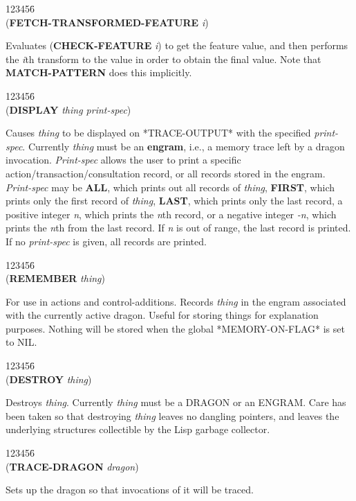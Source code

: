 \begin{tabbing}
123456\= \kill
\\
({\bf FETCH-TRANSFORMED-FEATURE} {\it i\/})
\end{tabbing}
Evaluates ({\bf CHECK-FEATURE} {\it i\/}) to get the feature value,
and then performs the {\it i\/}th transform to the value in order to
obtain the final value.  Note that {\bf MATCH-PATTERN} does this
implicitly.

\begin{tabbing}
123456\= \kill
\\
({\bf DISPLAY} {\it thing print-spec\/})
\end{tabbing}
Causes {\it thing\/} to be displayed on *TRACE-OUTPUT* with the specified
{\it print-spec\/}.  Currently {\it thing\/} must be an {\bf engram}, i.e., a
memory trace left by a dragon invocation.  {\it Print-spec\/}
allows the user to print a specific action/transaction/consultation
record, or all records stored in the engram.  {\it Print-spec\/}
may be {\bf ALL}, which prints out all records of {\it thing\/}, {\bf FIRST},
which prints only the first record of {\it thing\/}, {\bf LAST}, which
prints only the last record, a positive integer {\it n\/}, which prints the
{\it n\/}th record, or a negative integer {\it -n\/}, which prints the
{\it n\/}th from the last record.  If {\it n\/} is out of range, the last
record is printed.  If no {\it print-spec\/} is given, all records are printed.

\begin{tabbing}
123456\= \kill
\\
({\bf REMEMBER} {\it thing\/})
\end{tabbing}
For use in actions and control-additions.  Records {\it thing\/} in the
engram associated with the currently active dragon.  Useful for
storing things for explanation purposes.  Nothing will be stored when
the global *MEMORY-ON-FLAG* is set to NIL.

\begin{tabbing}
123456\= \kill
\\
({\bf DESTROY} {\it thing\/})
\end{tabbing}
Destroys {\it thing\/}.  Currently {\it thing\/} must be a DRAGON or an
ENGRAM.  Care has been taken so that destroying {\it thing\/} leaves no
dangling pointers, and leaves the underlying structures collectible by
the Lisp garbage collector.

\begin{tabbing}
123456\= \kill
\\
({\bf TRACE-DRAGON} {\it dragon\/})
\end{tabbing}
Sets up the dragon so that invocations of it will be traced. 

